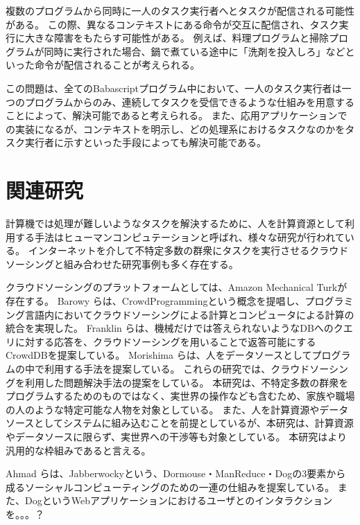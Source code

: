 \documentclass[twoside]{wiss}
\begin{document}
複数のプログラムから同時に一人のタスク実行者へとタスクが配信される可能性がある。
この際、異なるコンテキストにある命令が交互に配信され、タスク実行に大きな障害をもたらす可能性がある。
例えば、料理プログラムと掃除プログラムが同時に実行された場合、鍋で煮ている途中に「洗剤を投入しろ」などといった命令が配信されることが考えられる。

この問題は、全てのBabascriptプログラム中において、一人のタスク実行者は一つのプログラムからのみ、連続してタスクを受信できるような仕組みを用意することによって、解決可能であると考えられる。
また、応用アプリケーションでの実装になるが、コンテキストを明示し、どの処理系におけるタスクなのかをタスク実行者に示すといった手段によっても解決可能である。

\section{関連研究}

計算機では処理が難しいようなタスクを解決するために、人を計算資源として利用する手法はヒューマンコンピュテーション\cite{humancomputation}と呼ばれ、様々な研究が行われている。
インターネットを介して不特定多数の群衆にタスクを実行させるクラウドソーシングと組み合わせた研究事例も多く存在する。

クラウドソーシングのプラットフォームとしては、Amazon Mechanical Turk\cite{mechanicalturk}が存在する。
Barowy らは、CrowdProgrammingという概念を提唱し、プログラミング言語内においてクラウドソーシングによる計算とコンピュータによる計算の統合を実現した\cite{automan}。
Franklin らは、機械だけでは答えられないようなDBへのクエリに対する応答を、クラウドソーシングを用いることで返答可能にするCrowdDBを提案している\cite{crowddb}。
Morishima らは、人をデータソースとしてプログラムの中で利用する手法を提案している\cite{cylog}。
これらの研究では、クラウドソーシングを利用した問題解決手法の提案をしている。
本研究は、不特定多数の群衆をプログラムするためのものではなく、実世界の操作なども含むため、家族や職場の人のような特定可能な人物を対象としている。
また、人を計算資源やデータソースとしてシステムに組み込むことを前提としているが、本研究は、計算資源やデータソースに限らず、実世界への干渉等も対象としている。
本研究はより汎用的な枠組みであると言える。

Ahmad らは、Jabberwocky\cite{jabberwocky}という、Dormouse・ManReduce・Dogの3要素から成るソーシャルコンピューティングのための一連の仕組みを提案している。
また、Dog\cite{dog}というWebアプリケーションにおけるユーザとのインタラクションを。。。？


\end{document}
